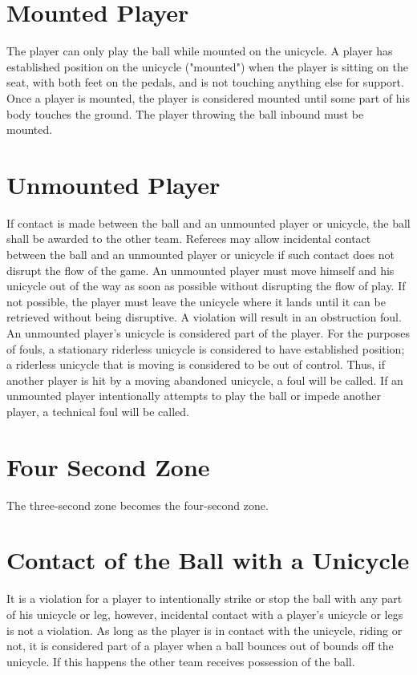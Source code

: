 \section{Mounted Player}
The player can only play the ball while mounted on the unicycle. A player has established position on the unicycle
("mounted") when the player is sitting on the seat, with both feet on the pedals, and is not touching anything else for
support. Once a player is mounted, the player is considered mounted until some part of his body touches the ground. The
player throwing the ball inbound must be mounted.
\section{Unmounted Player}
If contact is made between the ball and an unmounted player or unicycle, the ball shall be awarded to the other team.
Referees may allow incidental contact between the ball and an unmounted player or unicycle if such contact does not
disrupt the flow of the game. An unmounted player must move himself and his unicycle out of the way as soon as possible
without disrupting the flow of play. If not possible, the player must leave the unicycle where it lands until it can be
retrieved without being disruptive. A violation will result in an obstruction foul.\\
An unmounted player's unicycle is considered part of the player. For the purposes of fouls, a stationary riderless unicycle
is considered to have established position; a riderless unicycle that is moving is considered to be out of control. Thus, if
another player is hit by a moving abandoned unicycle, a foul will be called. If an unmounted player intentionally attempts
to play the ball or impede another player, a technical foul will be called.
\section{Four Second Zone}
The three-second zone becomes the four-second zone.
\section{Contact of the Ball with a Unicycle}
It is a violation for a player to intentionally strike or stop the ball with any part of his unicycle or leg, however, incidental
contact with a player's unicycle or legs is not a violation. As long as the player is in contact with the unicycle, riding or
not, it is considered part of a player when a ball bounces out of bounds off the unicycle. If this happens the other team
receives possession of the ball.
